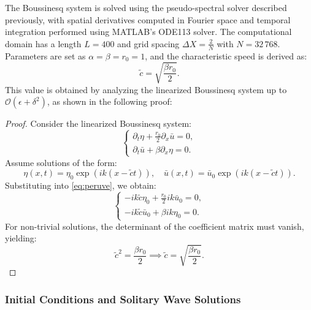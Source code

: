 \documentclass[alpha-refs, 12pt]{wiley-article}
\renewcommand{\O}{\mathcal{O}}
\begin{document}
The Boussinesq system is solved using the pseudo-spectral solver described previously, with spatial derivatives computed in Fourier space and temporal integration performed using MATLAB's ODE113 solver. The computational domain has a length $L = 400$ and grid spacing $\Delta X = \frac{2}{N}$ with $N = 32\,768$. Parameters are set as $\alpha = \beta = r_0 = 1$, and the characteristic speed is derived as:
\[
  \tilde{c} = \sqrt{\dfrac{\beta r_0}{2}}.
\]
This value is obtained by analyzing the linearized Boussinesq system up to $\O(\epsilon + \delta^2)$, as shown in the following proof:
\begin{proof}
  Consider the linearized Boussinesq system:
  \begin{equation}
  \label{eq:peruve}
  \begin{cases}
  \partial_t \eta + \frac{r_0}{2} \partial_x \bar{u} = 0, \\
  \partial_t \bar{u} + \beta \partial_x \eta = 0.
  \end{cases}
  \end{equation}
  Assume solutions of the form:
  \[
  \eta(x,t) = \eta_0 \exp(i k (x - \tilde{c} t)), \quad \bar{u}(x,t) = \bar{u}_0 \exp(i k (x - \tilde{c} t)).
  \]
  Substituting into \eqref{eq:peruve}, we obtain:
  \[
  \begin{cases}
  -i k \tilde{c} \eta_0 + \frac{r_0}{2} i k \bar{u}_0 = 0, \\
  -i k \tilde{c} \bar{u}_0 + \beta i k \eta_0 = 0.
  \end{cases}
  \]
  For non-trivial solutions, the determinant of the coefficient matrix must vanish, yielding:
  \[
  \tilde{c}^2 = \frac{\beta r_0}{2} \implies \tilde{c} = \sqrt{\frac{\beta r_0}{2}}.
  \]
\end{proof}

\subsubsection{Initial Conditions and Solitary Wave Solutions}
\end{document}
